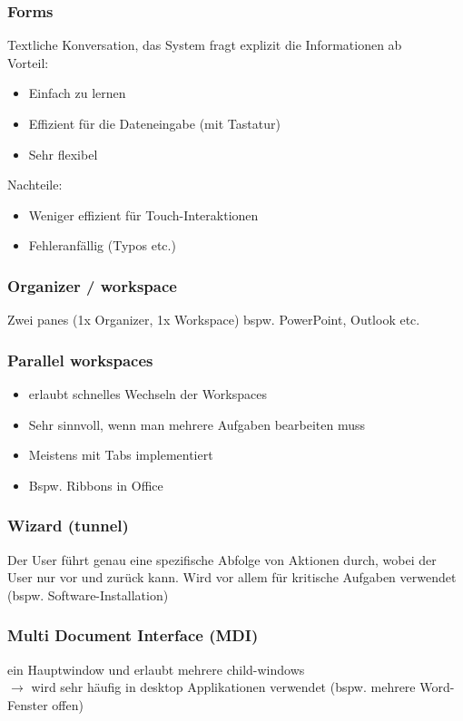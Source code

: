 \documentclass{report}
\theoremstyle{definition}
\theoremstyle{example}
\begin{document}
\subsubsection{Forms}
Textliche Konversation, das System fragt explizit die Informationen ab\\
Vorteil: 
\begin{itemize}
   \item Einfach zu lernen
   \item Effizient für die Dateneingabe (mit Tastatur)
   \item Sehr flexibel
\end{itemize}
Nachteile:
\begin{itemize}
   \item Weniger effizient für Touch-Interaktionen
   \item Fehleranfällig (Typos etc.)
\end{itemize}

\subsubsection{Organizer / workspace}
Zwei panes (1x Organizer, 1x Workspace) bspw. PowerPoint, Outlook etc.

\subsubsection{Parallel workspaces}
\begin{itemize}
   \item erlaubt schnelles Wechseln der Workspaces 
   \item Sehr sinnvoll, wenn man mehrere Aufgaben bearbeiten muss
   \item Meistens mit Tabs implementiert
   \item Bspw. Ribbons in Office
\end{itemize}

 \subsubsection{Wizard (tunnel)}
 Der User führt genau eine spezifische Abfolge von Aktionen durch, wobei der User nur vor und zurück kann. 
 Wird vor allem für kritische Aufgaben verwendet (bspw. Software-Installation)

 \subsubsection{Multi Document Interface (MDI)}
 ein Hauptwindow und erlaubt mehrere child-windows\\
 $\rightarrow$ wird sehr häufig in desktop Applikationen verwendet (bspw. mehrere Word-Fenster offen)
\end{document}
